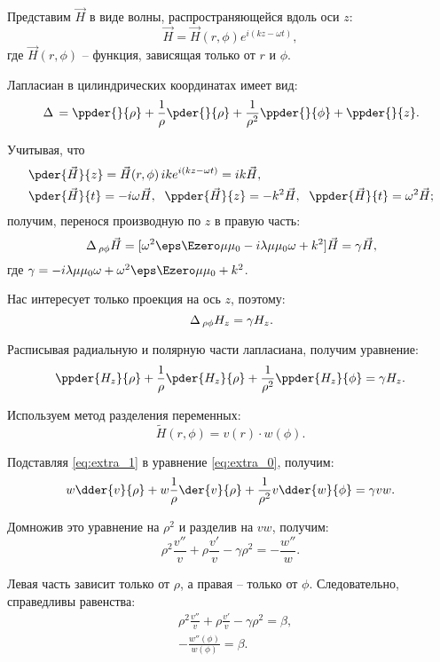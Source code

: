 Представим \( \vec{H} \) в виде волны, распространяющейся вдоль оси \( z \):
\begin{equation}
    \vec{H} =\vec{H}(r, \phi) e^{i(kz -\omega t)},
    \label{eq:7}
\end{equation}
где \( \vec{H}(r, \phi) \) -- функция, зависящая только от \( r \) и \( \phi \).

Лапласиан в цилиндрических координатах имеет вид:
\[
    \L = \ppder{}{\rho} + \frac{1}{\rho} \pder{}{\rho} + \frac{1}{\rho^2} \ppder{}{\phi}
    + \ppder{}{z}.
\]

Учитывая, что
\begin{align*}
    & \pder{\vec{H}}{z} = \vec{H}(r, \phi)\, ike^{i(kz - \omega t)} = ik\vec{H}, \\
    & \pder{\vec{H}}{t} = -i\omega\vec{H}, \; \ \ppder{\vec{H}}{z} = -k^2\vec{H}, \;\ 
    \ppder{\vec{H}}{t} = \omega^2\vec{H};
\end{align*}
получим, перенося производную по \( z \) в правую часть:
\[
    \L_{\rho\phi}\vec{H} = [\omega^2\eps\Ezero\mu\mu_0 - i\lambda\mu\mu_0\omega
    + k^2]\vec{H}
    = \gamma\vec{H},
\]
где \( \gamma = -i\lambda\mu\mu_0\omega + \omega^2\eps\Ezero\mu\mu_0 + k^2 \).

Нас интересует только проекция на ось \( z \), поэтому:
\[
    \,\Delta\,_{\rho\phi} H_z = \gamma H_z.
\]

Расписывая радиальную и полярную части лапласиана, получим уравнение:
\begin{equation}
    \ppder{H_z}{\rho} + \frac{1}{\rho} \pder{H_z}{\rho} + \frac{1}{\rho^2} \ppder{H_z}{\phi}
    = \gamma H_z.
    \label{eq:extra_0}
\end{equation}

Используем метод разделения переменных:
\begin{equation}
    \tilde{H}(r, \phi) = v(r)\cdot w(\phi).
    \label{eq:extra_1}
\end{equation}

Подставляя \eqref{eq:extra_1} в уравнение \eqref{eq:extra_0}, получим:
\[
    w\dder{v}{\rho} + w\frac{1}{\rho}\der{v}{\rho} + \frac{1}{\rho^2}v\dder{w}{\phi}
    = \gamma vw.
\]

Домножив это уравнение на \( \rho^2 \) и разделив на \( vw \), получим:
\[
    \rho^2\frac{v''}{v} + \rho\frac{v'}{v} - \gamma\rho^2 = -\frac{w''}{w}.
\]

Левая часть зависит только от \( \rho \), а правая -- только от \( \phi \). Следовательно,
справедливы равенства:
\begin{align*}
    & \rho^2\frac{v''}{v} + \rho\frac{v'}{v} - \gamma\rho^2 = \beta, \\
    & -\frac{w''(\phi)}{w(\phi)} = \beta.
\end{align*}

